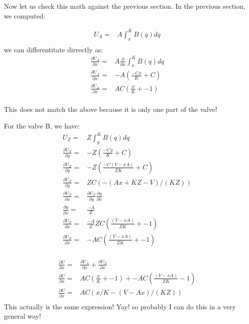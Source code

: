 \documentclass{asme2ej}
\begin{document}
Now let us check this math against the previous section.
In the previous section, we computed:

\begin{align}
  U_A = & A \int_x^K B(q) dq \\
\end{align}
we can differentitate dirrectly as:
\begin{align}
  \frac{\partial U_A}{\partial x} = & A \frac{\partial}{\partial x} \int_x^K B(q) dq \\
  \frac{\partial U_A}{\partial x} = & -A (\frac{-Cx}{K} + C) \\
  \frac{\partial U_A}{\partial x} = &  AC(\frac{x}{K} + -1) \\
\end{align}

This does not match the above because it is only one part of the valve!

For the valve B, we have:
\begin{align}
  U_Z = & Z \int_y^K B(q) dq \\
  \frac{\partial U_Z}{\partial y} = & - Z (\frac{-Cy}{K} + C) \\
  \frac{\partial U_Z}{\partial y} = & - Z (\frac{-C(V-xA)}{ZK} + C) \\
  \frac{\partial U_Z}{\partial y} = &  Z C(-(A x + K Z - V)/(K Z)) \\
  \frac{\partial U_Z}{\partial x} = &  \frac{\partial U_Z}{\partial y} \frac{\partial y}{\partial x}\\
  \frac{\partial y}{\partial x}  =  & \frac{-A}{Z}\\
  \frac{\partial U_Z}{\partial x} = & \frac{-A}{Z} Z C(\frac{(V-xA)}{ZK} + -1) \\
  \frac{\partial U_Z}{\partial x} = & -A C(\frac{(V-xA)}{ZK} + -1) \\
\end{align}


\begin{align}
  \frac{\partial U}{\partial x} = & \frac{\partial U_A}{\partial x} + \frac{\partial U_Z}{\partial x}\\
  \frac{\partial U}{\partial x} = & AC(\frac{x}{K} + -1) + -A C(\frac{(V-xA)}{ZK} - 1)\\
  \frac{\partial U}{\partial x} = & A C (x/K - (V - A x)/(K Z))\\
\end{align}
This actually is the same expression! Yay!  so probably I can do this in a very general way!
\end{document}
